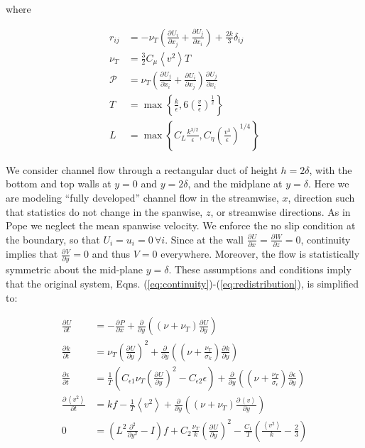 \documentclass[a4paper,11pt]{article}
\newcommand{\chevron}[1]{\left\langle #1 \right\rangle}
\newcommand{\pderiv}[3][]{%
  \ensuremath{\frac{\partial^{#1} {#2}}{\partial {#3}^{#1}}}}
\newcommand{\noi}{\noindent}
\newcommand{\ep}{\epsilon}
\begin{document}
\noi where 

\begin{align*}
r_{ij} &= -\nu_T\left(\pderiv{U_i}{x_j} + \pderiv{U_j}{x_i}\right) +
\frac{2k}{3}\delta_{ij}\\
\nu_T &= \frac{3}{2}C_\mu \chevron{v^2} T \\
\mathcal{P} &= \nu_T\left( \pderiv{U_j}{x_i} + \pderiv{U_i}{x_j}\right)\pderiv{U_j}{x_i} \\
T &= \max \left\{ \frac{k}{\ep} , 6 \left( \frac{v}{\ep} \right)^{\frac{1}{2}}
\right\} \\
L &= \max \left\{ C_L \frac{k^{3/2}}{\ep}, C_\eta \left( \frac{v^3}{\ep}
\right)^{1/4} \right\}
\end{align*}

We consider channel flow through a rectangular duct of height $h= 2\delta$, with
the bottom and top walls at $y=0$ and $y=2\delta$, and the midplane at
$y=\delta$.
Here we are modeling ``fully developed'' channel flow in the streamwise, $x$,
direction such that statistics do not change in the spanwise, $z$, or
streamwise directions. As in Pope \cite{pope} we neglect the mean spanwise
velocity. 
We enforce the no slip condition at the boundary, so that
$U_i=u_i=0 \, \forall i$. Since at the wall
$\pderiv{U}{x}=\pderiv{W}{z} = 0$, continuity implies that
$\pderiv{V}{y}=0$ and thus $V=0$ everywhere. Moreover, the flow is statistically
symmetric about the mid-plane $y = \delta$. These assumptions and conditions
imply that the original system, Eqns.
(\ref{eq:continuity})-(\ref{eq:redistribution}), is simplified to: 

\begin{align}
	\label{eq:ssv2f1}
        \pderiv{U}{t} &= -\pderiv{P}{x} +
\pderiv{}{y}\left((\nu+\nu_T)\pderiv{U}{y}\right) \\
        \pderiv{k}{t} &= \nu_T\left(\pderiv{U}{y}\right)^2 + 
\pderiv{}{y}\left((\nu+\frac{\nu_T}{\sigma_k})\pderiv{k}{y}\right) \\
        \pderiv{\ep}{t} &= \frac{1}{T}\left(C_{\ep
1}\nu_T\left(\pderiv{U}{y}\right)^2 - C_{\ep 2}\ep\right) + 
\pderiv{}{y}\left((\nu+\frac{\nu_T}{\sigma_\ep})\pderiv{\ep}{y}\right) \\
        \pderiv{\chevron{v^2}}{t} &= kf - \frac{1}{T}\chevron{v^2} +
\pderiv{}{y}\left((\nu+\nu_T)\pderiv{\chevron{v}}{y}\right) \\
        0 &= \left( L^2\frac{\partial^2}{\partial y^2} - I\right)f +
C_2\frac{\nu_T}{k}\left(\pderiv{U}{y}\right)^2 -
\frac{C_1}{T}\left(\frac{\chevron{v^2}}{k}-\frac{2}{3}\right)
	\label{eq:ssv2f5}
\end{align}
\end{document}
